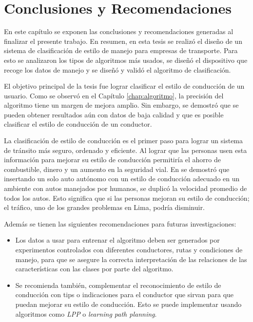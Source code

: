 \chapter{Conclusiones y Recomendaciones}
\label{chap:Conclusiones}


 \graphicspath{{Chapter6/Figuras/}{Chapter6/Figs/PDF/}{Chapter4/Figs/}}


En este capítulo se exponen las conclusiones y recomendaciones generadas al finalizar el presente trabajo. En resumen, en esta tesis se realizó el diseño de un sistema de clasificación de estilo de manejo para empresas de transporte. Para esto se analizaron los tipos de algoritmos más usados, se diseñó el dispositivo que recoge los datos de manejo y se diseñó y validó el algoritmo de clasificación.

El objetivo principal de la tesis fue lograr clasificar el estilo de conducción de un usuario. Como se observó en el Capítulo \ref{chap:algoritmo}, la precisión del algoritmo tiene un margen de mejora amplio. Sin embargo, se demostró que se pueden obtener resultados aún con datos de baja calidad y que es posible clasificar el estilo de conducción de un conductor.

La clasificación de estilo de conducción es el primer paso para lograr un sistema de tránsito más seguro, ordenado y eficiente. Al lograr que las personas usen esta información para mejorar su estilo de conducción permitiría el ahorro de combustible, dinero y un aumento en la seguridad vial. En \cite{vinitsky2018benchmarks} se demostró que insertando un solo auto autónomo con un estilo de conducción adecuado en un ambiente con autos manejados por humanos, se duplicó la velocidad promedio de todos los autos. Esto significa que si las personas mejoran su estilo de conducción; el tráfico, uno de los grandes problemas en Lima, podría disminuir.

Además se tienen las siguientes recomendaciones para futuras investigaciones:
\begin{itemize}
    \itemsep0em
    \item Los datos a usar para entrenar el algoritmo deben ser generados por experimentos controlados con diferentes conductores, rutas y condiciones de manejo, para que se asegure la correcta interpretación de las relaciones de las características con las clases por parte del algoritmo.
    \item Se recomienda también, complementar el reconocimiento de estilo de conducción con tips o indicaciones para el conductor que sirvan para que puedan mejorar su estilo de conducción. Esto se puede implementar usando algoritmos como \textit{LPP} o \textit{learning path planning}.
\end{itemize}


